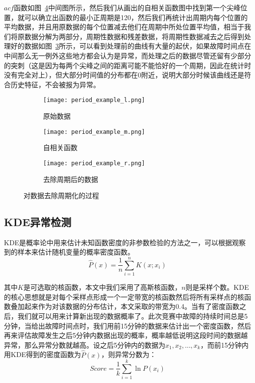 $acf$函数如图~\ref{fig:period}中间图所示，然后我们从画出的自相关函数图中找到第一个尖峰位置，就可以确立出函数的最小正周期是120，然后我们再统计出周期内每个位置的平均数据，并且用原数据的每个位置减去他们在周期中所处位置平均值，相当于我们将原数据分解为两部分，周期性数据和残差数据，将周期性数据减去之后得到处理好的数据如图~\ref{fig:period:right}所示，可以看到处理前的曲线有大量的起伏，如果故障时间点在中间那么无一例外这些地方都会认为是异常，而处理之后的数据尽管还留有少部分的突刺（这是因为每两个尖峰之间的距离可能不能恰好的一个周期，因此在统计时没有完全对上），但大部分时间值的分布都在0附近，说明大部分时候该曲线还是符合历史特征，不会被报为异常。
\begin{figure}[htbp]
  \begin{subfigure}[b]{0.335\textwidth}
    \begin{minipage}[t]{\linewidth}
    \centering
    \texttt{[image: period\_example\_l.png]}
    \caption{原始数据}
    \label{fig:period:left}
    \end{minipage}
  \end{subfigure}
  \begin{subfigure}[b]{0.325\textwidth}
    \begin{minipage}[t]{\linewidth}
    \centering
    \texttt{[image: period\_example\_m.png]}
    \caption{自相关函数}
    \label{fig:period:middle}
    \end{minipage}
  \end{subfigure}
  \begin{subfigure}[b]{0.325\textwidth}
    \begin{minipage}[t]{\linewidth}
      \centering
      \texttt{[image: period\_example\_r.png]}
      \caption{去除周期后的数据}
      \label{fig:period:right}
      \end{minipage}
    \end{subfigure}
    \caption{对数据去除周期化的过程}
    \label{fig:period}
\end{figure}
\subsection{KDE异常检测}
KDE是概率论中用来估计未知函数密度的非参数检验的方法之一，可以根据观察到的样本来估计随机变量的概率密度函数。
\begin{equation*}
\hat{P}(x) = \frac{1}{n}\sum_{i=1}^nK(x;x_i)
\end{equation*}

其中$K$是可选取的核函数，本文中我们采用了高斯核函数，$n$则是采样个数。KDE的核心思想就是对每个采样点形成一个一定带宽的核函数然后将所有采样点的核函数叠加起来作为对该数据的分布估计，本文采取的带宽为0.4。当有了密度函数之后，我们就可以用来计算新出现的数据概率了。此次竞赛中故障的持续时间总是5分钟，当给出故障时间点时，我们用前15分钟的数据来估计出一个密度函数，然后再来评估故障发生之后5分钟内数据出现的概率，概率越低说明这段时间的数据越异常，那么异常分数就越高。设之后5分钟内的数据为$x_1,x_2,\dots,x_k$，而前15分钟内用KDE得到的密度函数为$\hat{P}(x)$，则异常分数为：
\begin{equation*}
  Score = \frac{1}{k}\sum_{i=1}^k\ln P(x_i)
\end{equation*}

